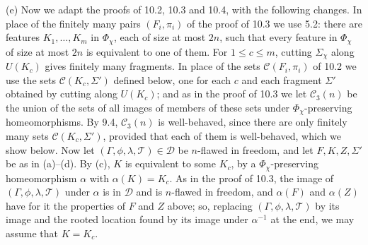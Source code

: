 {(e) Now we adapt the proofs of 10.2, 10.3 and 10.4, with the following changes. In place of the finitely many pairs $(F_i, \pi_i)$ of the proof of 10.3 we use 5.2: there are features $K_1, \dots, K_m$ in $\Phi_\chi$, each of size at most $2n$, such that every feature in $\Phi_\chi$ of size at most $2n$ is equivalent to one of them. For $1 \le c \le m$, cutting $\Sigma_\chi$ along $U(K_c)$ gives finitely many fragments. In place of the sets $\mathscr{C}(F_i, \pi_i)$ of 10.2 we use the sets $\mathscr{C}(K_c, \Sigma')$ defined below, one for each $c$ and each fragment $\Sigma'$ obtained by cutting along $U(K_c)$; and as in the proof of 10.3 we let $\mathscr{C}_3(n)$ be the union of the sets of all images of members of these sets under $\Phi_\chi$-preserving homeomorphisms. By 9.4, $\mathscr{C}_3(n)$ is well-behaved, since there are only finitely many sets $\mathscr{C}(K_c, \Sigma')$, provided that each of them is well-behaved, which we show below. Now let $(\Gamma, \phi, \lambda, \mathscr{T}) \in \mathscr{D}$ be $n$-flawed in freedom, and let $F, K, Z, \Sigma'$ be as in (a)--(d). By (c), $K$ is equivalent to some $K_c$, by a $\Phi_\chi$-preserving homeomorphism $\alpha$ with $\alpha(K) = K_c$. As in the proof of 10.3, the image of $(\Gamma, \phi, \lambda, \mathscr{T})$ under $\alpha$ is in $\mathscr{D}$ and is $n$-flawed in freedom, and $\alpha(F)$ and $\alpha(Z)$ have for it the properties of $F$ and $Z$ above; so, replacing $(\Gamma, \phi, \lambda, \mathscr{T})$ by its image and the rooted location found by its image under $\alpha^{-1}$ at the end, we may assume that $K = K_c$.

}
